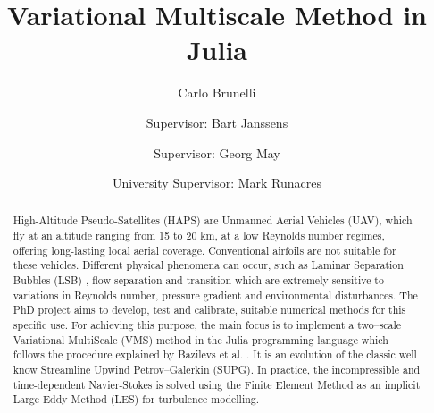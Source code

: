 \documentclass[final,authoryear,3p,times,twocolumn]{vki_phd}
\begin{document}
\begin{frontmatter}


%
%
%
%


\title{Variational Multiscale Method in Julia}
\author{Carlo Brunelli}
\address{Aeronautics and Aerospace Department, von Karman Institute for Fluid Dynamics, Belgium, carlo.brunelli@mil.be}
\author{Supervisor: Bart Janssens}
\address{Associate Professor, Mechanical Engineering Department, Royal Military Academy, Belgium, Bart.Janssens@mil.be}
\author{Supervisor: Georg May}
\address{Associate Professor, Aeronautics and Aerospace Department, von Karman Institute for Fluid Dynamics, Belgium, georg.may@vki.ac.be}
\author{University Supervisor: Mark Runacres}
\address{Professor, Engineering Technology Thermodynamics and Fluid Mechanics Group, VUB, Belgium, mark.runacres@vub.be}

\begin{abstract}
High-Altitude Pseudo-Satellites (HAPS) are Unmanned Aerial Vehicles (UAV), which fly at an altitude ranging from 15 to 20 km, at a low Reynolds number regimes, offering long-lasting local aerial coverage. Conventional airfoils are not suitable for these vehicles. Different physical phenomena can occur, such as Laminar Separation Bubbles (LSB) \cite{Selig1997HighLiftLR, Abhijit13, OMeara87}, flow separation and transition which are extremely sensitive to variations in
Reynolds number, pressure gradient and environmental disturbances. 
The PhD project aims to develop, test and calibrate, suitable numerical methods for this specific use. For achieving this purpose, the main focus is to implement a two–scale Variational MultiScale (VMS) method in the Julia programming language which follows the procedure explained by Bazilevs et al. \cite{Bazilevs2007}. It is an evolution of the classic well know Streamline Upwind Petrov–Galerkin (SUPG). In practice, the incompressible and time-dependent Navier-Stokes is solved using the Finite Element Method as an implicit Large Eddy Method (LES) for turbulence modelling. 


\end{abstract}
\end{frontmatter}
\end{document}
